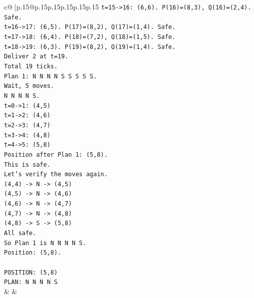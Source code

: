 \documentclass{article}
\begin{document}
{\begin{supertabular}{c@{$\;$}|p{.15\linewidth}@{}p{.15\linewidth}p{.15\linewidth}p{.15\linewidth}p{.15\linewidth}p{.15\linewidth}}
{{{\texttt{t=15{-}>16: (6,6). P(16)=(8,3), Q(16)=(2,4). Safe.} \\
\texttt{t=16{-}>17: (6,5). P(17)=(8,2), Q(17)=(1,4). Safe.} \\
\texttt{t=17{-}>18: (6,4). P(18)=(7,2), Q(18)=(1,5). Safe.} \\
\texttt{t=18{-}>19: (6,3). P(19)=(8,2), Q(19)=(1,4). Safe.} \\
\texttt{Deliver 2 at t=19.} \\
\texttt{Total 19 ticks.} \\
\texttt{Plan 1: N N N N S S S S S.} \\
\texttt{Wait, 5 moves.} \\
\texttt{N N N N S.} \\
\texttt{t=0{-}>1: (4,5)} \\
\texttt{t=1{-}>2: (4,6)} \\
\texttt{t=2{-}>3: (4,7)} \\
\texttt{t=3{-}>4: (4,8)} \\
\texttt{t=4{-}>5: (5,8)} \\
\texttt{Position after Plan 1: (5,8).} \\
\texttt{This is safe.} \\
\texttt{Let's verify the moves again.} \\
\texttt{(4,4) {-}> N {-}> (4,5)} \\
\texttt{(4,5) {-}> N {-}> (4,6)} \\
\texttt{(4,6) {-}> N {-}> (4,7)} \\
\texttt{(4,7) {-}> N {-}> (4,8)} \\
\texttt{(4,8) {-}> S {-}> (5,8)} \\
\texttt{All safe.} \\
\texttt{So Plan 1 is N N N N S.} \\
\texttt{Position: (5,8).} \\
\\ 
\texttt{POSITION: (5,8)} \\
\texttt{PLAN: N N N N S} \\
            }
        }
    }
    & & \\ \\


\end{supertabular}}
\end{document}
